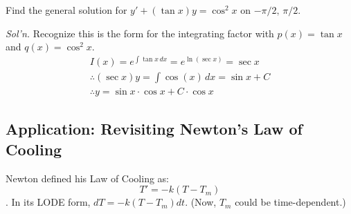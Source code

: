 \documentclass[../main.tex]{subfiles}
\begin{document}
\begin{example}[]
    Find the general solution for \( y'+ ( \tan x ) y=\cos^{2}x \)  on \( -\pi/2,\, \pi/2 \).

    \textit{Sol'n.} Recognize this is the form for the integrating factor with \( p(x)=\tan x \) and \( q(x) = \cos^{2}x \).
    \begin{align*}
        I(x)= e^{\int \tan x \,dx} = e^{\ln(\sec x)} = \sec x \\
        \therefore (\sec x) y = \int \cos (x) \,dx = \sin x + C \\
        \therefore y = \sin x \cdot \cos x + C \cdot \cos x
    \end{align*}
\end{example}


\subsection{Application: Revisiting Newton's Law of Cooling}

Newton defined his Law of Cooling as: \[ T' = -k(T-T_m) \].
In its LODE form, \( dT = -k(T-T_m)dt \). (Now, \( T_m \) could be time-dependent.)
\end{document}
